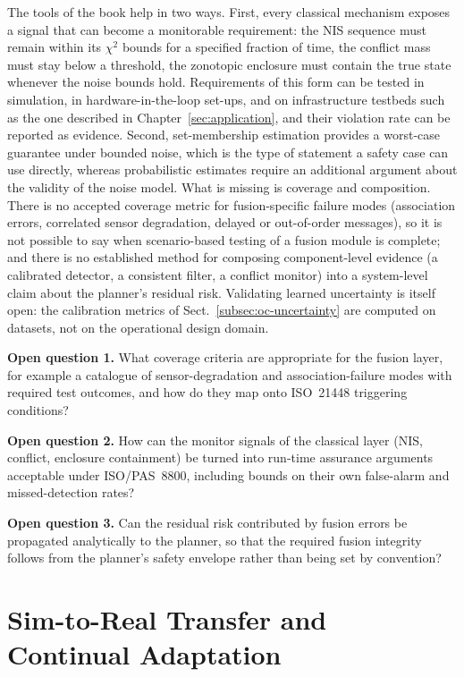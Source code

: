 The tools of the book help in two ways. First, every classical mechanism exposes a signal that can become a monitorable requirement: the NIS sequence must remain within its $\chi^2$ bounds for a specified fraction of time, the conflict mass must stay below a threshold, the zonotopic enclosure must contain the true state whenever the noise bounds hold. Requirements of this form can be tested in simulation, in hardware-in-the-loop set-ups, and on infrastructure testbeds such as the one described in Chapter~\ref{sec:application}, and their violation rate can be reported as evidence. Second, set-membership estimation provides a worst-case guarantee under bounded noise, which is the type of statement a safety case can use directly, whereas probabilistic estimates require an additional argument about the validity of the noise model. What is missing is coverage and composition. There is no accepted coverage metric for fusion-specific failure modes (association errors, correlated sensor degradation, delayed or out-of-order messages), so it is not possible to say when scenario-based testing of a fusion module is complete; and there is no established method for composing component-level evidence (a calibrated detector, a consistent filter, a conflict monitor) into a system-level claim about the planner's residual risk. Validating learned uncertainty is itself open: the calibration metrics of Sect.~\ref{subsec:oc-uncertainty} are computed on datasets, not on the operational design domain.

\begin{list4a}
    \item \textbf{Open question 1.} What coverage criteria are appropriate for the fusion layer, for example a catalogue of sensor-degradation and association-failure modes with required test outcomes, and how do they map onto ISO~21448 triggering conditions?
    \item \textbf{Open question 2.} How can the monitor signals of the classical layer (NIS, conflict, enclosure containment) be turned into run-time assurance arguments acceptable under ISO/PAS~8800, including bounds on their own false-alarm and missed-detection rates?
    \item \textbf{Open question 3.} Can the residual risk contributed by fusion errors be propagated analytically to the planner, so that the required fusion integrity follows from the planner's safety envelope rather than being set by convention?
\end{list4a}

\section{Sim-to-Real Transfer and Continual Adaptation}
\label{subsec:oc-sim2real}

